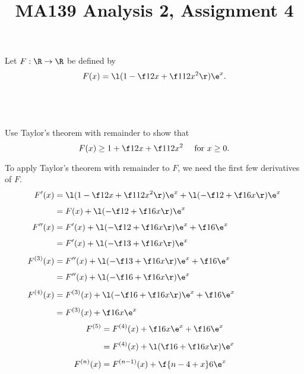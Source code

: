\documentclass[a4paper]{article}
\title{MA139 Analysis 2, Assignment 4}
\begin{document}
\maketitle

\setlength{\parindent}{0em}
\setlength{\parskip}{1em}


\begin{questionbody}
Let $F : \R \to \R$ be defined by \[
F(x) = \l( 1 - \f12 x + \f1{12} x^2 \r) \e^x.
\]
\end{questionbody}

\subsection{~} %

\begin{questionbody}
Use Taylor's theorem with remainder to show that \[
F(x) \ge 1 + \f12 x + \f1{12} x^2 \quad\text{ for } x \ge 0.
\]
\end{questionbody}

To apply Taylor's theorem with remainder to $F$, we need the first few derivatives of $F$. \begin{align*}
F'(x) &= \l( 1 - \f12 x + \f1{12} x^2 \r) \e^x + \l( - \f12 + \f16 x \r) \e^x\\[1ex]
&= F(x) + \l( - \f12 + \f16 x \r) \e^x\\[1ex]
F''(x) &= F'(x) + \l( - \f12 + \f16 x \r) \e^x + \f16 \e^x\\[1ex]
&= F'(x) + \l( - \f13 + \f16 x \r) \e^x\\[1ex]
F^{(3)}(x) &= F''(x) + \l( - \f13 + \f16 x \r) \e^x + \f16 \e^x\\[1ex]
&= F''(x) + \l( - \f16 + \f16 x \r) \e^x\\[1ex]
F^{(4)}(x) &= F^{(3)}(x) + \l( - \f16 + \f16 x \r) \e^x + \f16 \e^x\\[1ex]
&= F^{(3)}(x) + \f16 x \e^x
\end{align*}
\begin{align*}
F^{(5)} &= F^{(4)}(x) + \f16 x \e^x + \f16 \e^x\\[1ex]
&= F^{(4)}(x) + \l( \f16 + \f16 x \r) \e^x\\[1ex]
F^{(n)}(x) &= F^{(n-1)}(x) + \f{n - 4 + x}6 \e^x
\end{align*}
\end{document}
